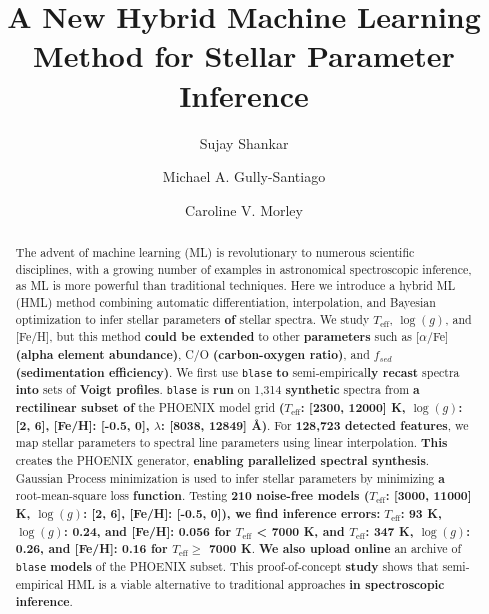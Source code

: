 \documentclass[twocolumn, linenumbers]{aastex631}
\begin{document}
\title{A New Hybrid Machine Learning Method for Stellar Parameter Inference}
\author[0000-0002-2290-6810]{Sujay Shankar}
\author[0000-0002-4020-3457]{Michael A. Gully-Santiago}
\author[0000-0002-4404-0456]{Caroline V. Morley}


\begin{abstract}
    The advent of machine learning (ML) is revolutionary to numerous scientific disciplines, with a growing number of examples in astronomical spectroscopic inference, as ML is more powerful than traditional techniques.
    Here we introduce a hybrid ML (HML) method combin{ing} automatic differentiation, interpolation, and Bayesian optimization to infer stellar parameters \textbf{of} stellar spectra.
    We study $T_{\mathrm{eff}}$, $\log(g)$, and [Fe/H], but this method \textbf{could be extended} to other \textbf{parameters} such as [$\alpha$/Fe] \textbf{(alpha element abundance)}, C/O \textbf{(carbon-oxygen ratio)}, and $f_{sed}$ \textbf{(sedimentation efficiency)}.
    We first use \texttt{blase} \textbf{to} semi-empirical\textbf{ly recast} spectra \textbf{into} sets of \textbf{Voigt profiles}.
    \texttt{blase} is \textbf{run} on 1,314 \textbf{synthetic} spectra from \textbf{a rectilinear subset of} the PHOENIX model grid \textbf{($T_\text{eff}$: [2300, 12000] K, $\log(g)$: [2, 6], [Fe/H]: [-0.5, 0], $\lambda$: [8038, 12849] \AA)}.
    For \textbf{128,723 detected features}, we map stellar parameters to spectral line parameters using linear interpolation.
    \textbf{This} create\textbf{s} the PHOENIX generator, \textbf{enabling parallelized spectral synthesis}.
    Gaussian Process minimization is used to infer stellar parameters by minimizing \textbf{a} root-mean-square loss \textbf{function}.
    Testing \textbf{210 noise-free models ($T_{\mathrm{eff}}$: [3000, 11000] K, $\log(g)$: [2, 6], [Fe/H]: [-0.5, 0]), we find inference errors:} $T_{\mathrm{eff}}$\textbf{: 93 K, $\log(g)$: 0.24, and [Fe/H]: 0.056 for $T_\text{eff}$ < 7000 K, and $T_{\mathrm{eff}}$: 347 K, $\log(g)$: 0.26, and [Fe/H]: 0.16 for $T_\text{eff} \ge$ 7000 K}.
    \textbf{We also upload online} an archive of \texttt{blase} \textbf{models} of the PHOENIX subset.
    This proof-of-concept \textbf{study} shows that semi-empirical HML is a viable alternative to traditional approaches \textbf{in spectroscopic inference}.
\end{abstract}
\end{document}
